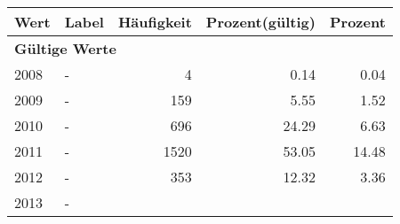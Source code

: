      \begin{longtable}{lXrrr}
     \toprule
     \textbf{Wert} & \textbf{Label} & \textbf{Häufigkeit} & \textbf{Prozent(gültig)} & \textbf{Prozent} \\
     \endhead
     \midrule
     \multicolumn{5}{l}{\textbf{Gültige Werte}}\\

     2008 &
     \multicolumn{1}{X}{ -  } &


       \num{4} &
       \num[round-mode=places,round-precision=2]{0.14} &
         \num[round-mode=places,round-precision=2]{0.04} \\

     2009 &
     \multicolumn{1}{X}{ -  } &


       \num{159} &
       \num[round-mode=places,round-precision=2]{5.55} &
         \num[round-mode=places,round-precision=2]{1.52} \\

     2010 &
     \multicolumn{1}{X}{ -  } &


       \num{696} &
       \num[round-mode=places,round-precision=2]{24.29} &
         \num[round-mode=places,round-precision=2]{6.63} \\

     2011 &
     \multicolumn{1}{X}{ -  } &


       \num{1520} &
       \num[round-mode=places,round-precision=2]{53.05} &
         \num[round-mode=places,round-precision=2]{14.48} \\

     2012 &
     \multicolumn{1}{X}{ -  } &


       \num{353} &
       \num[round-mode=places,round-precision=2]{12.32} &
         \num[round-mode=places,round-precision=2]{3.36} \\

     2013 &
     \multicolumn{1}{X}{ -  } &



\end{longtable}
